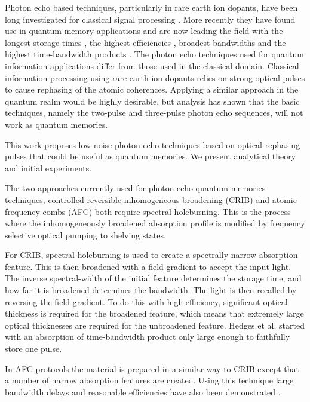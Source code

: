                                                                                                                                                                                                                                                                                                                                                                                                                                                                                                                                                                                                                                                                                                                                                                                                                                                                                                                                                                                                                                                                                                                                                                                                                                                                                                                                                                                                                                                                                                                                                                                                                                                                                                                                                                                                                                                                                                                                                                                                                                                                                                                                                                                                                                                                                                                                                                                                                                                                                                                                                                                                                                                                                                                                                                                                                                                                                                                                                                                                                                                                                                                                                                                                                                                                                                                                                                                                                                                                                                                                                                                                                                                                                                                                                                                                                                                                                                                                                                                                                                                                                                                                                                                                                                                                                                                                                                                                                                                                                                                                                                                                                                                                                                                                                                                                                                                                                                                                                                                                                                                                                                                                                                                                                                                                                                                                                                                                                                                                                                                                                                                                                                                                                                                                                                                                                                                                                                                                                                                                                                                                                                                                                                                                                                                                                                                                                                                                                                                                                                                                                                                                                                                                                                                                                                                                                                                                                                                                                                                                                                                                                                                                                                                                                                                                                                                                                                                                                                                                                                                                                                                                                                                                                                                                                                                                                                                                                                                                                                                                                                                                                                                                                                                                                                                                                                                                                                                                                                                                                                                                                                                                                                                                                                                                                                                                                                                                                                                                                                                                                                                                                                                                                                                                                                                                                                                                                                                                                                                                                                                                                                                                                                                                                                                                                                                                                                                                                                                                                                                                                                                                                                                                                                                                                                                                                                                                                                                                                                                                                                                                                                                                                                                                                                                                                                                                                                                                                                                                                                                                                                                                                                                                                                                                                                                                                                                                                                                                                                                                                                                                                                                                                                                                                                                                                                                                                                                                                                                                                                                                                                                                                                                                                                                                                                                                                                                                                                                                                                                                                                                                                                                                                                                                                                                                                                                                                                                                                                                                                                                                                                                                                                                                                                                                                                                                                                                                                                                                                                                                                                                                                                                                                                                                                                                                                                                                                                                                                                                                                                                                                                                                                                                                                                                                                                                                                                                                                                                                                                                                                                                                                                                                                                                                                                                                                                                                                                                                                                                                                                                                                                                                                                                                                                                                                                                                                                                                                                                                                                                                                                                                                                                                                                                                                                                                                                                                                                                                                                                                                                                                                                                                                                                                                                                                                                                                                                                                                                                                                                                                                                                                                                                                                                                                                                                                                                                                                                                                                                                                                                                                                                                                                                                                                                                                                                                                                                                                                                                                                                                                                                                                                                                                                                                                                                                                                                                                                                                                                                                                                                                                                                                                                                                                                                                                                                                                                                                                                                                                                                                                                                                                                                                                                                                                                                                                                                                                                                                                                                                                                                                                                                                                                                                                                                                                                                                                                                                                                                                                                                                                                                                                                                                                                                                                                                                                                                                                                                                                                                                                                                                                                                                                                                                                                                                                                                                                                                                                                                                                                                                                                                                                                                                                                                                                                                                                                                                                                                                                                                                                                                                                                                                                                                                                                                                                                                                                                                                                                                                                                                                                                                                                                                                                                                                                                                                                                                                                                                                                                                                                                                                                                                                                                                                                                                                                                                                                                                                                                                                                                                                                                                                                                                                                                                                                                                                                                                                                                                                                                                                                                                                                                                                                                                                                                                                                                                                                                                                                                                                                                                                                                                                                                                                                                                                                                                                                                                                                                                                                                                                                                                                                                                                                                                                                                                                                                                                                                                                                                                                                                                                                                                                                                                                                                                                                                                                                                                                                                                                                                                                                                                                                                                                                                                                                                                                                                                                                                                                                                                                                                                                                                                                                                                                                                                                                                                                                                                                                                                                                                                                                                                                                                                                                                                                                                                                                                                                                                                                                                                                                                                                                                                                                                                                                                                                                                                                                                                                                                                                                                                                                                                                                                                                                                                                                                                                                                                                                                                                                                                                                                                                                                                                                                                                                                                                                                                                                                                                                                                                                                                                                                                                                                                                                                                                                                                                                                                                                                                                                                                                                                                                                                                                                                                                                                                                                                                                                                                                                                                                                                                                                                                                                                                                                                                                                                                                                                                                                                                                                                                                                                                                                                                                                                                                                                                                                                                                                                                                                                                                                                                                                                                                                                                                                                                                                                                                                                                                                                                                                                                                                                                                                                                                                                                                                                                                                                                                                                                                                                                                                                                                                                                                                                                                                                                                                                                                                                                                                                                                                                                                                                                                                                                                                                                                                                                                                                                                                                                                                                                                                                                                                                                                                                                                                                                                                                                                                                                                                                                                                                                                                                                                                                                                                                                                                                                                                                                                                                                                                                                                                                                                                                                                                                                                                                                                                                                                                                                                                                                                                                                                                                                                                                                                                                                                                                                                                                                                                                                                                                                                                                                                                                                                                                                                                                                                                                                                                                                                                                                                                                                                                                                                                                                                                                                                                                                                                                                                                                                                                                                                                                                                                                                                                                                                                                                                                                                                                                                                                                                                                                                                                                                                                                                                                                                                                                                                                                                                                                                                                                                                                                                                                                                                                                                                                                                                                                                                                                                                                                                                                                                                                                                                                                                                                                                                                                                                                                                                                                                                                                                                                                                                                                                                                                                                                                                                                                                                                                                                                                                                                                                                                                                                                                                                                                                                                                                                                                                                                                                                                                                                                                                                                                                                                                                                                                                                                                                                                                                                                                                                                                                                                                                                                                                                                                                                                                                                                                                                                                                                                                                                                                                                                                                                                                                                                                                                                                                                                                                                                                                                                                                                                                                                                                                                                                                                                                                                                                                                                                                                                                                                                                                                                                                                                                                                                                                                                                                                                                                                                                                                                                                                                                                                                                                                                                                                                                                                                                                                                                                                                                                                                                                                                                                                                                                                                                                                                                                                                                                                                                                                                                                                                                                                                                                                                                                                                                                                                                                                                                                                                                                                                                                                                                                                                                                                                                                                                                                                                                                                                                                                                                                                                                                                                                                                                                                                                                                                                                                                                                                                                                                                                                                                                                                                                                                                                                                                                                                                                                                                                                                                                                                                                                                                                                                                                                                                                                                                                                                                                                                                                                                                                                                                                                                                                                                                                                                                                                                                                                                                                                                                                                                                                                                                                                                                                                                                                                                                                                                                                                                                                                                                                                                                                                                                                                                                                                                                                                                                                                                                                                                                                                                                                                                                                                                                                                                                                                                                                                                                                                                                                                                                                                                                                                                                                                                                                                                                                                                                                                                                                                                                                                                                                                                                                                                                                                                                                                                                                                                                                                                                                                                                                                                                                                                                                                                                                                                                                                                                                                                                                                                                                                                                                                                                                                                                                                                                                                                                                                                                                                                                                                                                                                                                                                                                                                                                                                                                                                                                                                                                                                                                                                                                                                                                                                                                                                                                                                                                                                                                                                                                                                                                                                                                                                                                                                                                                                                                                                                                                                                                                                                                                                                                                                                                                                                                                                                                                                                                                                                                                                                                                                                                                                                                                                                                                                                                                                                                                                                                                                                                                                                                                                                                                                                                                                                                                                                                                                                                                                                                                                                                                                                                                                                                                                                                                                                                                                                                                                                                                                                                                                                                                                                                                                                                                                                                                                                                                                                                                                                                                                                                                                                                                                                                                                                                    \documentclass[superscriptaddress,pra,twocolumn,showpacs,amsmath,amssymb,aps,a4paper]{revtex4}
\begin{document}
Photon echo based techniques, particularly in rare earth ion dopants,
have been long investigated for classical signal processing
\cite{moss82}.  More recently they have found use in quantum
memory applications and are now leading the field with the
longest storage times \cite{frav05,stopped}, the highest efficiencies
\cite{hedg10}, broadest bandwidths \cite{sagl10} and the highest
time-bandwidth products \cite{usma10}.  The photon echo techniques
used for quantum information applications differ from those
used in the classical domain.  Classical information processing
using rare earth ion dopants relies on strong optical pulses to cause
rephasing of the atomic coherences. Applying a similar approach in the quantum realm would be
highly desirable, but analysis has shown that the
basic techniques, namely the two-pulse \cite{ledi10,rugg08} and three-pulse \cite{sang10} photon echo sequences, will not work as quantum memories.

This work proposes low noise photon echo techniques based on optical
rephasing pulses that could be useful as quantum memories. We
present analytical theory and initial experiments.

The two approaches currently used for photon echo quantum memories
techniques, controlled reversible inhomogeneous broadening
(CRIB)\cite{mois01,krau06,alex06,long08,hete08,hedg10} and atomic
frequency combs (AFC)\cite{ried08,afze09} both require spectral
holeburning. This is the process where the inhomogeneously broadened
absorption profile is modified by frequency selective optical pumping
to shelving states.

For CRIB, spectral holeburning is used to create a spectrally narrow
absorption feature.  This is then broadened with a field gradient to
accept the input light. The inverse spectral-width of the initial
feature determines the storage time, and how far it is broadened
determines the
bandwidth. The light is then recalled by reversing the field
gradient. To do this with high efficiency, significant optical
thickness is required for the broadened feature, which means that
extremely large optical thicknesses are required for the unbroadened
feature. Hedges et al.\cite{hedg10} started with an absorption of
 %
time-bandwidth product only large enough to faithfully store one
pulse.

In AFC protocols the material is prepared in a similar way to CRIB except that
a number of narrow absorption features are created. Using this technique
large bandwidth delays \cite{usma10} and reasonable efficiencies have also been
demonstrated \cite{chan10}.
\end{document}
